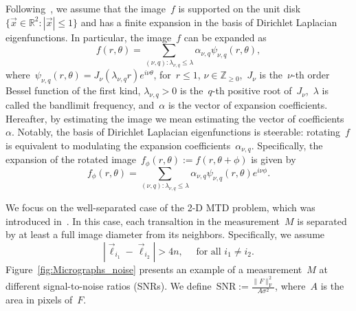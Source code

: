 \documentclass{article}
\begin{document}
Following~\cite{marshall2020image, bendory2021multi, kreymer2021two}, we assume that the image~$f$ is supported on the unit disk \mbox{$\{\vec{x} \in \mathbb{R}^2: |\vec{x}| \le 1\}$}
and has a finite expansion in the basis of Dirichlet Laplacian eigenfunctions. In particular, the image~$f$ can be expanded as
\begin{equation}
\label{eq:expansion}
f (r, \theta) = \sum_{(\nu, q): \lambda_{\nu, q} \le \lambda} \alpha_{\nu, q} \psi_{\nu, q} (r, \theta),
\end{equation}
where~$\psi_{\nu, q}(r,\theta) = J_\nu\left( \lambda_{\nu, q} r \right) e^{i \nu \theta}$, for~\mbox{$r \le 1$}, $\nu \in \mathbb{Z}_{\ge 0}$,~$J_\nu$ is the~\mbox{$\nu$-th} order Bessel function of the first kind, \mbox{$\lambda_{\nu, q} > 0$} is the~\mbox{$q$-th} positive root of~$J_\nu$,~$\lambda$ is called the bandlimit frequency, and~$\alpha$ is the vector of expansion coefficients. Hereafter, by estimating the image we mean estimating the vector of coefficients~$\alpha$. Notably, the basis of Dirichlet Laplacian eigenfunctions is steerable: rotating~$f$ is equivalent to modulating the expansion coefficients~$\alpha_{\nu, q}$. Specifically, the expansion of the rotated image~$f_\phi (r, \theta) := f(r, \theta + \phi)$ is given by
\begin{equation}
\label{eq:steering}
f_\phi (r, \theta) = \sum_{(\nu, q): \lambda_{\nu, q} \le \lambda} \alpha_{\nu, q} \psi_{\nu, q} (r, \theta) e^{i \nu \phi}.
\end{equation}

We focus on the \mbox{well-separated} case of the 2-D MTD problem, which was introduced in~\cite{marshall2020image, bendory2021multi}. In this case, each transaltion in the measurement~$M$ is separated by at least a full image diameter from its neighbors. Specifically, we assume
\begin{equation}
\label{eq:sep}
|\vec{\ell}_{i_1} - \vec{\ell}_{i_2}| > 4n, \quad \text{ for all } i_1 \ne i_2.
\end{equation}
Figure~\ref{fig:Micrographs_noise} presents an example of a measurement~$M$ at different signal-to-noise ratios (SNRs). We define~\mbox{$\text{SNR} := \frac{\|F\|_\text{F}^2}{A \sigma^2}$}, where~$A$ is the area in pixels of~$F$.
\end{document}
